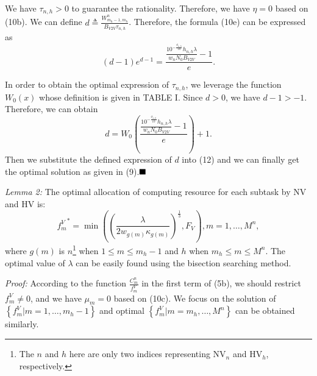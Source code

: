 \documentclass[lettersize,journal]{IEEEtran}
\begin{document}
We have $\tau_{n,h}>0$ to guarantee the rationality. Therefore, we have $\eta=0$ based on (10b). We can define $d\triangleq\frac{W_{m_h-1,m_h}^n}{B_{V2V}\tau_{n,h}}$. Therefore, the formula (10e) can be expressed as
\begin{equation*}
(d-1)e^{d-1}=\frac{\frac{10^{-\frac{\phi_{n,h}}{10}} h_{n,h}\lambda}{w_n N_0 B_{V2V}}-1}{e}. \tag{11}
\end{equation*}

In order to obtain the optimal expression of $\tau_{n,h}$, we leverage the function $W_0(x)$ whose definition is given in TABLE I. Since $d>0$, we have $d-1 > -1$. Therefore, we can obtain
\begin{equation*}
d=W_0\left(\frac{\frac{10^{-\frac{\phi_{n,h}}{10}} h_{n,h}\lambda}{w_n N_0 B_{V2V}}-1}{e}\right)+1. \tag{12}
\end{equation*}
Then we substitute the defined expression of $d$ into (12) and we can finally get the optimal solution as given in (9).$\hfill\blacksquare$


\emph{Lemma 2:} The optimal allocation of computing resource for each subtask by NV and HV is:
\begin{equation*}
{f^V_{m}}^*=\min \left ({\left ({\frac {\lambda }{2w_{g(m)}\kappa _{g(m)}}}\right)^{\frac {1}{3}}, F_V}\right), m=1,\ldots, M^n, \tag{13}
\end{equation*}
where $g(m)$ is $n$\footnote{The $n$ and $h$ here are only two indices representing NV$_n$ and HV$_h$, respectively.} when $1 \leq m \leq m_h-1$ and $h$ when $m_h \leq m \leq M^n$. The optimal value of $\lambda$ can be easily found using the bisection searching method.


\emph{Proof:} According to the function $\frac{C_m^n}{f^V_{m}}$ in the first term of (5b), we should restrict $f^V_{m}\neq0$, and we have $\mu_m=0$ based on (10c). We focus on the solution of $\left\{f^{V}_{m}|m=1,\ldots,m_h-1 \right\}$ and optimal $\left\{f^{V}_{m}|m=m_h,\ldots,M^n \right\}$ can be obtained similarly.
\end{document}
